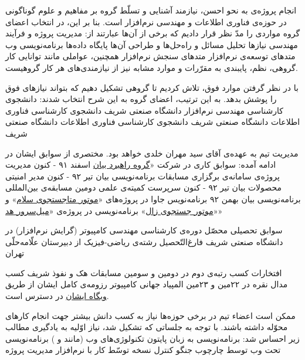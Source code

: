 انجام پروژه‌ی \PRJN{}  به نحو احسن، نیازمند آشنایی و تسلّط  گروه بر مفاهیم و علوم گوناگونی در حوزه‌ی فناوری اطلاعات و مهندسی نرم‌افزار است. بنا بر این، در انتخاب اعضای گروه \GRPN{} مواردی را مدّ نظر قرار دادیم که برخی از آن‌ها عبارتند از:
 مدیریت پروژه و فرآیند
 مهندسی نیازها
 تحلیل مسائل و راه‌حل‌ها و طراحی آن‌ها
 پایگاه داده‌ها
 برنامه‌نویسی وب
 متدهای توسعه‌ی نرم‌افزار
 متدهای سنجش نرم‌افزار
همچنین، عواملی مانند توانایی کار گروهی، نظم، پایبندی به مقرّرات و موارد مشابه نیز از نیازمندی‌های هر کار گروهیست.

با در نظر گرفتن موارد فوق، تلاش کردیم تا گروهی تشکیل دهیم که بتواند نیازهای فوق را پوشش بدهد. به این ترتیب، اعضای گروه \GRPN{} به این شرح انتخاب شدند:
 دانشجوی کارشناسی مهندسی نرم‌افزار دانشگاه صنعتی شریف
 دانشجوی کارشناسی فناوری اطلاعات دانشگاه صنعتی شریف
 دانشجوی کارشناسی فناوری اطلاعات دانشگاه صنعتی شریف

مدیریت تیم به عهده‌ی آقای سید مهران خلدی خواهد بود. مختصری از سوابق ایشان در ادامه آمده:
 سوابق کاری در شرکت «\href{http://bayan.co.ir/}{گروه راهبرد بیان} \hfill اسفند ۹۱ - کنون
 مدیریت پروژه‌ی سامانه‌ی برگزاری مسابقات برنامه‌نویسی بیان \hfill تیر ۹۲ - کنون
 مدیر امنیتی محصولات بیان \hfill تیر ۹۲ - کنون
 سرپرست کمیته‌ی علمی دومین مسابقه‌ی بین‌المللی برنامه‌نویسی بیان \hfill بهمن ۹۲
 برنامه‌نویس جاوا در پروژه‌های «\href{http://salam.ir/}{موتور متاجستجوی سلام}» و «\href{http://zal.ir/}{موتور جستجوی زال}» 
 برنامه‌نویسی  در پروژه‌ی «\href{http://hod.ir/}{میل‌سرور هد}»

 سوابق تحصیلی
 محصّل دوره‌ی کارشناسی مهندسی کامپیوتر (گرایش نرم‌افزار) در دانشگاه صنعتی شریف
 فارغ‌التّحصیل رشته‌ی ریاضی-فیزیک از دبیرستان علّامه‌حلّی تهران

 افتخارات
 کسب رتبه‌ی دوم در دومین و سومین مسابقات هک و نفوذ شریف
 کسب مدال نقره در ۲۲مین و ۲۳مین المپیاد جهانی کامپیوتر
رزومه‌ی کامل ایشان از طریق \href{http://www.semekh.ir/}{وبگاه ایشان} در دسترس است.


ممکن است اعضاء تیم در برخی حوزه‌ها نیاز به کسب دانش بیشتر جهت انجام کارهای محوّله داشته باشند. با توجه به جلساتی که تشکیل شد، نیاز اوّلیه به یادگیری مطالب زیر احساس شد:
 برنامه‌نویسی به زبان پایتون
 تکنولوژی‌های وب (مانند  و )
 برنامه‌نویسی تحت وب توسط چارچوب جنگو
 کنترل نسخه توسّط 
 کار با نرم‌افزار مدیریت پروژه 

